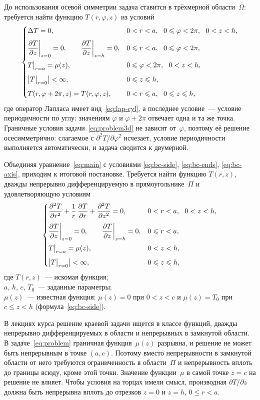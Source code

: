 До использования осевой симметрии задача ставится в трёхмерной
области~$\Omega$: требуется найти функцию $T(r,\varphi,z)$ из условий
\begin{equation}
\label{eq:problem3d}
\begin{cases}
\Delta T=0,
  & 0<r<a,\ \ 0\le\varphi<2\pi,\ \ 0<z<h,\\[6pt]
\pd{T}{z}\bigg|_{z=0}=0,\qquad \pd{T}{z}\bigg|_{z=h}=0,
  & 0\le r<a,\ \ 0\le\varphi<2\pi,\\[10pt]
T\big|_{r=a}=\mu(z),
  & 0\le\varphi<2\pi,\ \ 0<z<h,\\[6pt]
\bigl|T\big|_{r=0}\bigr|<\infty,
  & 0\le z\le h,\\[6pt]
T(r,\varphi+2\pi,z)=T(r,\varphi,z),
  & 0<r\le a,\ \ 0\le z\le h,
\end{cases}
\postdisplaypenalty=10000
\end{equation}
где оператор Лапласа имеет вид~\eqref{eq:lap-cyl}, а последнее условие~—
условие периодичности по углу: значениям $\varphi$ и $\varphi+2\pi$
отвечает одна и та же точка. Граничные условия
задачи~\eqref{eq:problem3d} не зависят от~$\varphi$, поэтому её решение
осесимметрично: слагаемое с $\partial^2T/\partial\varphi^2$ исчезает,
условие периодичности выполняется автоматически, и задача сводится
к двумерной.

Объединяя уравнение~\eqref{eq:main} с условиями
\eqref{eq:bc-side}, \eqref{eq:bc-ends}, \eqref{eq:bc-axis}, приходим
к итоговой постановке. Требуется найти функцию $T(r,z)$, дважды непрерывно
дифференцируемую в прямоугольнике~$\Pi$ и удовлетворяющую условиям
\begin{equation}
\label{eq:problem}
\begin{cases}
\dfrac{\partial^2 T}{\partial r^2}+\dfrac{1}{r}\,\dfrac{\partial T}{\partial r}+\dfrac{\partial^2 T}{\partial z^2}=0,
  & 0<r<a,\ \ 0<z<h,\\[10pt]
\dfrac{\partial T}{\partial z}\bigg|_{z=0}=0,\qquad \dfrac{\partial T}{\partial z}\bigg|_{z=h}=0,
  & 0\leqslant r<a,\\[10pt]
T\big|_{r=a}=\mu(z),
  & 0<z<h,\\[6pt]
\bigl|T\big|_{r=0}\bigr|<\infty,
  & 0\leqslant z\leqslant h,
\end{cases}
\end{equation}
где $T(r,z)$~— искомая функция;\\
\hphantom{где }$a$, $h$, $c$, $T_0$~— заданные параметры;\\
\hphantom{где }$\mu(z)$~— известная функция: $\mu(z)=0$ при
\mbox{$0<z<c$} и $\mu(z)=T_0$ при \mbox{$c\le z<h$}
(формула~\eqref{eq:bc-side}).

В лекциях курса решение краевой задачи ищется в классе функций, дважды
непрерывно дифференцируемых в области и непрерывных в замкнутой области.
В задаче~\eqref{eq:problem} граничная функция~$\mu(z)$ разрывна, и решение
не может быть непрерывным в точке $(a,c)$. Поэтому вместо непрерывности
в замкнутой области от него требуются ограниченность в области~$\Pi$
и непрерывность вплоть до границы всюду, кроме этой точки. Значение
функции~$\mu$ в самой точке $z=c$ на решение не влияет. Чтобы условия на
торцах имели смысл, производная $\partial T/\partial z$ должна быть
непрерывна вплоть до отрезков $z=0$ и $z=h$, $0\le r<a$.

